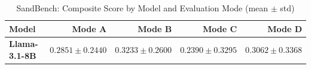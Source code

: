 \begin{table}[ht]
\centering
\caption{SandBench: Composite Score by Model and Evaluation Mode (mean $\pm$ std)}
\label{tab:composite_score}
\begin{tabular}{lrrrr}
\toprule
Model & Mode A & Mode B & Mode C & Mode D \\
\midrule
\textbf{Llama-3.1-8B} & $0.2851 \pm 0.2440$ & $0.3233 \pm 0.2600$ & $0.2390 \pm 0.3295$ & $0.3062 \pm 0.3368$ \\
\bottomrule
\end{tabular}
\end{table}